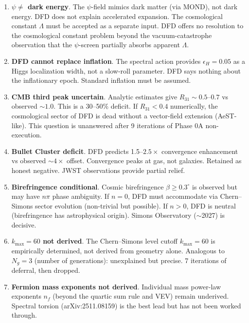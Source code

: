 \documentclass[11pt,a4paper]{article}
\begin{document}
\begin{enumerate}[label=\textbf{N\arabic*.}, leftmargin=2cm]

\item \textbf{$\psi \neq$ dark energy}. The $\psi$-field mimics dark matter (via MOND), not dark energy. DFD does not explain accelerated expansion. The cosmological constant $\Lambda$ must be accepted as a separate input. DFD offers no resolution to the cosmological constant problem beyond the vacuum-catastrophe observation that the $\psi$-screen partially absorbs apparent $\Lambda$.

\item \textbf{DFD cannot replace inflation}. The spectral action provides $\epsilon_H = 0.05$ as a Higgs localization width, not a slow-roll parameter. DFD says nothing about the inflationary epoch. Standard inflation must be assumed.

\item \textbf{CMB third peak uncertain}. Analytic estimates give $R_{31} \sim 0.5$--$0.7$ vs observed $\sim 1.0$. This is a 30--50\% deficit. If $R_{31} < 0.4$ numerically, the cosmological sector of DFD is dead without a vector-field extension (AeST-like). This question is unanswered after 9 iterations of Phase 0A non-execution.

\item \textbf{Bullet Cluster deficit}. DFD predicts 1.5--$2.5\times$ convergence enhancement vs observed $\sim 4\times$ offset. Convergence peaks at gas, not galaxies. Retained as honest negative. JWST observations provide partial relief.

\item \textbf{Birefringence conditional}. Cosmic birefringence $\beta \geq 0.3^\circ$ is observed but may have $n\pi$ phase ambiguity. If $n = 0$, DFD must accommodate via Chern--Simons sector evolution (non-trivial but possible). If $n > 0$, DFD is neutral (birefringence has astrophysical origin). Simons Observatory ($\sim$2027) is decisive.

\item \textbf{$k_{\max} = 60$ not derived}. The Chern--Simons level cutoff $k_{\max} = 60$ is empirically determined, not derived from geometry alone. Analogous to $N_g = 3$ (number of generations): unexplained but precise. 7 iterations of deferral, then dropped.

\item \textbf{Fermion mass exponents not derived}. Individual mass power-law exponents $n_f$ (beyond the quartic sum rule and VEV) remain underived. Spectral torsion (arXiv:2511.08159) is the best lead but has not been worked through.


\end{enumerate}
\end{document}
